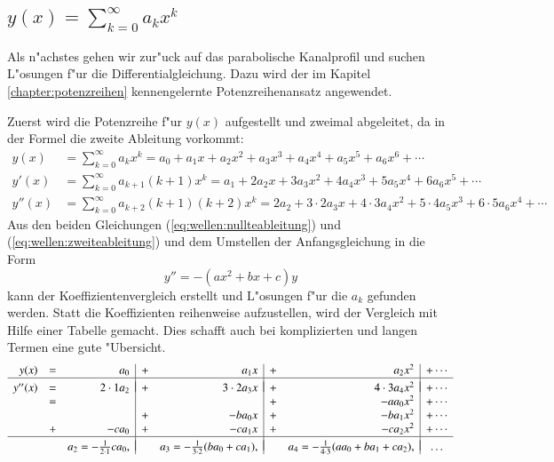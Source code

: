 \subsection{\texorpdfstring{$y(x) = \sum_{k = 0}^{\infty} a_{k}x^k$}{y(x) = 
summe k = 0 bis unendlich ak xk}}
\label{subsec:wellen:Potenzreihenansatz}

Als n"achstes gehen wir zur"uck auf das parabolische Kanalprofil und suchen 
L"osungen f"ur die Differentialgleichung. Dazu wird der im Kapitel 
\ref{chapter:potenzreihen} kennengelernte Potenzreihenansatz angewendet.

Zuerst wird die Potenzreihe f"ur $y(x)$ aufgestellt und zweimal abgeleitet, da 
in der Formel die zweite Ableitung vorkommt:
\begin{align}
	y(x)
	&=
	\sum_{k = 0}^{\infty} a_{k}x^k
	=
	a_0 + a_1x + a_2x^2 + a_3x^3 + a_4x^4 + a_5x^5 + a_6x^6 + \dotsb
	\label{eq:wellen:nullteableitung}
	\\
	y'(x)
	&=
	\sum_{k=0}^{\infty} a_{k+1}(k+1)x^k
	=
	a_1 + 2a_2x + 3a_3x^2 + 4a_4x^3 + 5a_5x^4 + 6a_6x^5+ \dotsb
	\\
	y''(x)
	&=
	\sum_{k = 0}^{\infty} a_{k+2}(k+1)(k+2)x^k
	=
	2a_2 + 3 \mathbin{\cdot} 2a_3x + 4 \mathbin{\cdot} 3a_4x^2 + 5 
	\mathbin{\cdot} 4a_5x^3 + 6 \mathbin{\cdot} 5a_6x^4 + \dotsb
	\label{eq:wellen:zweiteableitung}
\end{align}
Aus den beiden Gleichungen (\ref{eq:wellen:nullteableitung}) und
(\ref{eq:wellen:zweiteableitung}) und dem Umstellen der Anfangsgleichung in die 
Form
\begin{equation*}
	y'' = -(ax^2+bx+c)y
\end{equation*}
kann der Koeffizientenvergleich erstellt und L"osungen f"ur die $a_k$ gefunden 
werden. Statt die Koeffizienten reihenweise aufzustellen, wird der Vergleich 
mit Hilfe einer Tabelle gemacht. Dies schafft auch bei komplizierten und langen 
Termen eine gute "Ubersicht.
\begin{equation}
	\begin{array}{r c r | c r | c r | c r c}
	y(x) & = &
	a_0 & + & a_1x & + & a_2x^2 & + \dotsb
	\\
	\hline&&&&&&&\\[-2ex]
	y''(x) & = &
	2\cdot1 a_2 & + & 3\cdot2 a_3x & + & 4\cdot3 a_4x^2 & + \dotsb
	\\
	& = &
	& & & + &- aa_0x^2 & + \dotsb
	\\
	& &
	& + &- ba_0x & + &- ba_1x^2 & + \dotsb
	\\
	& + &
	-ca_0 & + &- ca_1x & + &- ca_2x^2 & + \dotsb
	\\
	\hline&&&&&&&\\[-2ex]
	& &
	a_2 = -\frac{1}{2 \cdot 1}ca_0,
	& & a_3 = -\frac{1}{3 \cdot 2}(ba_0+ca_1),
	& & a_4 = -\frac{1}{4 \cdot 3}(aa_0+ba_1+ca_2),
	& \dots
	\end{array}
	\label{eq:wellen:koeffizietenvergleichtabelle}
\end{equation}

